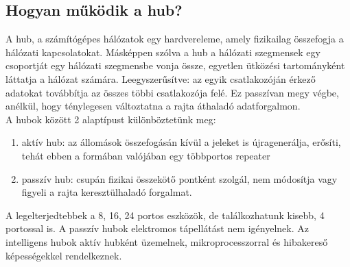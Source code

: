 \documentclass[12pt, a4paper]{article}
\begin{document}
\subsection{Hogyan működik a hub?}
A hub, a számítógépes hálózatok egy hardvereleme, amely fizikailag összefogja a hálózati kapcsolatokat. Másképpen szólva a hub a hálózati szegmensek egy csoportját egy hálózati szegmensbe vonja össze, egyetlen ütközési tartományként láttatja a hálózat számára. Leegyszerűsítve: az egyik csatlakozóján érkező adatokat továbbítja az összes többi csatlakozója felé. Ez passzívan megy végbe, anélkül, hogy ténylegesen változtatna a rajta áthaladó adatforgalmon.\\
A hubok között 2 alaptípust különböztetünk meg:
\begin{enumerate}
\item
aktív hub: az állomások összefogásán kívül a jeleket is újragenerálja, erősíti, tehát ebben a formában valójában egy többportos repeater
\item
passzív hub: csupán fizikai összekötő pontként szolgál, nem módosítja vagy figyeli a rajta keresztülhaladó forgalmat.
\end{enumerate}
A legelterjedtebbek a 8, 16, 24 portos eszközök, de találkozhatunk kisebb, 4 portossal is. A passzív hubok elektromos tápellátást nem igényelnek. Az intelligens hubok aktív hubként üzemelnek, mikroprocesszorral és hibakereső képességekkel rendelkeznek.
\end{document}
